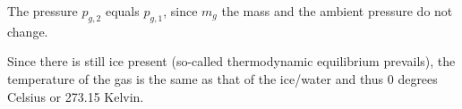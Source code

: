 The pressure \( p_{g,2} \) equals \( p_{g,1} \), since \( m_g \) the mass and the ambient pressure do not change.

Since there is still ice present (so-called thermodynamic equilibrium prevails), the temperature of the gas is the same as that of the ice/water and thus 0 degrees Celsius or 273.15 Kelvin.
